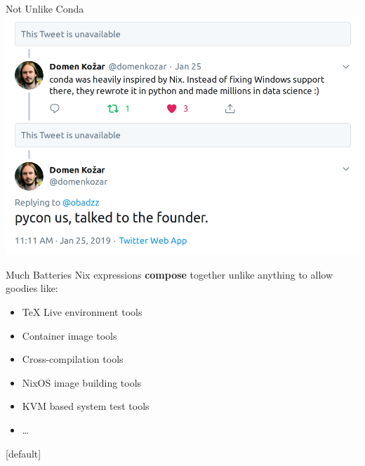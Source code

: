 \documentclass[10pt,aspectratio=169]{beamer}
\begin{document}
\begin{frame}{Not Unlike Conda}
\vspace{0.2cm}
\includegraphics[width=0.6\paperwidth]{images/nix-conda-tweet.png}
\end{frame}


\begin{frame}{Much Batteries}
  Nix expressions \textbf{compose} together unlike anything to allow goodies like:
  \begin{itemize}
    \item TeX Live environment tools
    \item Container image tools
    \item Cross-compilation tools
    \item NixOS image building tools
    \item KVM based system test tools
    \item \ldots
  \end{itemize}
\end{frame}


[default]


\end{document}

